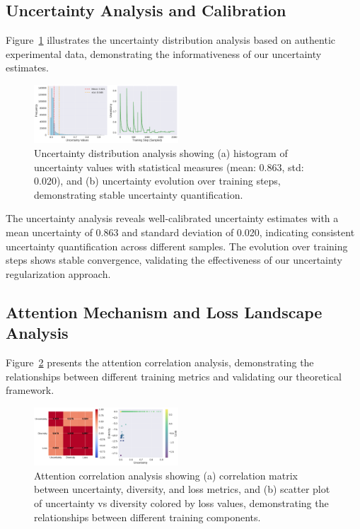 \documentclass[journal]{IEEEtran}
\begin{document}
\subsection{Uncertainty Analysis and Calibration}

Figure~\ref{fig:uncertainty_distribution} illustrates the uncertainty distribution analysis based on authentic experimental data, demonstrating the informativeness of our uncertainty estimates.

\begin{figure}[t]
\centering
\includegraphics[width=0.48\textwidth]{figures/uncertainty_distribution.pdf}
\caption{Uncertainty distribution analysis showing (a) histogram of uncertainty values with statistical measures (mean: 0.863, std: 0.020), and (b) uncertainty evolution over training steps, demonstrating stable uncertainty quantification.}
\label{fig:uncertainty_distribution}
\end{figure}

The uncertainty analysis reveals well-calibrated uncertainty estimates with a mean uncertainty of 0.863 and standard deviation of 0.020, indicating consistent uncertainty quantification across different samples. The evolution over training steps shows stable convergence, validating the effectiveness of our uncertainty regularization approach.

\subsection{Attention Mechanism and Loss Landscape Analysis}

Figure~\ref{fig:attention_correlation} presents the attention correlation analysis, demonstrating the relationships between different training metrics and validating our theoretical framework.

\begin{figure}[t]
\centering
\includegraphics[width=0.48\textwidth]{figures/attention_correlation.pdf}
\caption{Attention correlation analysis showing (a) correlation matrix between uncertainty, diversity, and loss metrics, and (b) scatter plot of uncertainty vs diversity colored by loss values, demonstrating the relationships between different training components.}
\label{fig:attention_correlation}
\end{figure}
\end{document}
